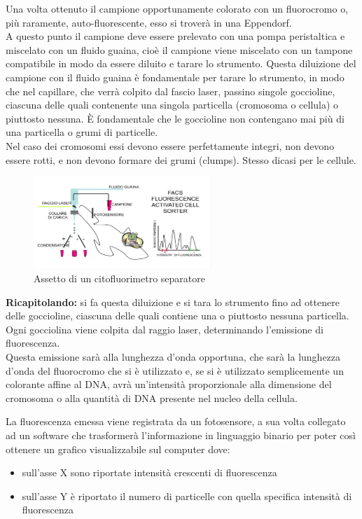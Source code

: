 \documentclass[11pt]{book}
\begin{document}
Una volta ottenuto il campione opportunamente colorato con un fluorocromo o, più raramente, auto-fluorescente, esso si troverà in una Eppendorf.\\
A questo punto il campione deve essere prelevato con una pompa peristaltica e miscelato con un fluido guaina, cioè il campione viene miscelato con un tampone compatibile in modo da essere diluito e tarare lo strumento. Questa diluizione del campione con il fluido guaina è fondamentale per tarare lo strumento, in modo che nel capillare, che verrà colpito dal fascio laser, passino singole goccioline, ciascuna delle quali contenente una singola particella (cromosoma o cellula) o piuttosto nessuna. È fondamentale che le goccioline non contengano mai più di una particella o grumi di particelle.\\
Nel caso dei cromosomi essi devono essere perfettamente integri, non devono essere rotti, e non devono formare dei grumi (clumps). Stesso dicasi per le cellule.


\begin{figure}
    \includegraphics[width=0.6\textwidth]{img/citofluorimetro_separatore.png}
  \caption{Assetto di un citofluorimetro separatore}
\end{figure}

\textbf{Ricapitolando:} si fa questa diluizione e si tara lo strumento fino ad ottenere delle goccioline, ciascuna delle quali contiene una o piuttosto nessuna particella.\\
Ogni gocciolina viene colpita dal raggio laser, determinando l’emissione di fluorescenza.\\
Questa emissione sarà alla lunghezza d’onda opportuna, che sarà la lunghezza d’onda del fluorocromo che si è utilizzato e, se si è utilizzato semplicemente un colorante affine al DNA, avrà un’intensità proporzionale alla dimensione del cromosoma o alla quantità di DNA presente nel nucleo della cellula.

La fluorescenza emessa viene registrata da un fotosensore, a sua volta collegato ad un software che trasformerà l’informazione in linguaggio binario per poter così ottenere un grafico visualizzabile sul computer dove:
\begin{itemize}
\item sull’asse X sono riportate intensità crescenti di fluorescenza
\item sull’asse Y è riportato il numero di particelle con quella specifica intensità di fluorescenza
\end{itemize}
\end{document}
